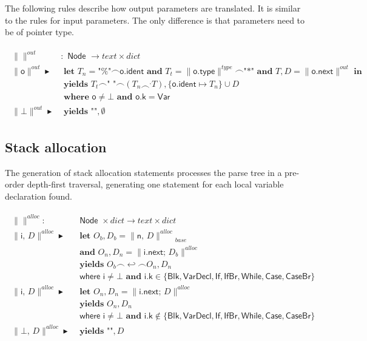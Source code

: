 \documentclass{article}
\newcommand{\trad}[2]{\ensuremath{\lVert \textsf{#1} \rVert^{\textit{#2}}}}
\newcommand{\nl}[0]{\ensuremath{\hookleftarrow}}
\newcommand{\mty}[0]{\texttt{""}}
\DeclareMathOperator{\conc}{\smallfrown}
\DeclareMathOperator{\isdef}{\blacktriangleright}
\begin{document}
The following rules describe how output parameters are translated. It
is similar to the rules for input parameters. The only difference is
that parameters need to be of pointer type.

\begin{framed}
  \begin{align}
\begin{split}
    \trad{}{out} &: \textsf{ Node } \rightarrow text \times dict \\
    \trad{o}{out} \isdef& \textbf{ let } T_n = \textsf{"\%"} \conc \textsf{o.ident} 
    \textbf{ and } T_t = \trad{o.type}{type} \conc \texttt{"*"}
    \textbf{ and } T, D = \trad{o.next}{out} \textbf{ in}  \\
    & \textbf{ yields } T_t \conc \texttt{" "} \conc (T_n \conc^, T), \{ \textsf{o.ident} \mapsto T_n \} \cup D  \\
    & \textbf{ where } \textsf{o} \ne \bot \textbf{ and } \textsf{o.k} = \textsf{Var}  \\
    \trad{$\bot$}{out} \isdef& \textbf{ yields } \mty, \emptyset  
  \end{split}
\end{align}
\end{framed}

\subsection{Stack allocation}
\label{sec:trad-alloc}

The generation of stack allocation statements processes the parse tree
in a pre-order depth-first traversal, generating one statement for
each local variable declaration found. 

\begin{framed}
  \begin{align}
\begin{split}
    \trad{}{alloc} : & \textsf{ Node } \times dict \rightarrow text \times dict \\
    \trad{i, $D$}{alloc} \isdef 
    & \textbf{ let } O_b, D_b = \trad{n, $D$}{alloc}_{base}  \\
    & \textbf{ and } O_n, D_n = \trad{i.next; $D_b$}{alloc}  \\
    & \textbf{ yields } O_b \conc \nl \conc O_n, D_n  \\
    & \textsf{ where } \textsf{i} \ne \bot \textbf{ and } \textsf{i.k} \in \{\textsf{Blk}, \textsf{VarDecl}, \textsf{If}, \textsf{IfBr}, \textsf{While}, \textsf{Case}, \textsf{CaseBr} \}  \\
    \trad{i, $D$}{alloc} \isdef 
    & \textbf{ let } O_n, D_n = \trad{i.next; $D$}{alloc}  \\
    & \textbf{ yields } O_n, D_n  \\
    & \textsf{ where } \textsf{i} \ne \bot \textbf{ and } \textsf{i.k} \not\in \{\textsf{Blk}, \textsf{VarDecl}, \textsf{If}, \textsf{IfBr}, \textsf{While}, \textsf{Case}, \textsf{CaseBr} \}  \\
    \trad{$\bot$, $D$}{alloc} \isdef & \textbf{ yields } \mty, D 
  \end{split}
\end{align}
\end{framed}
\end{document}
